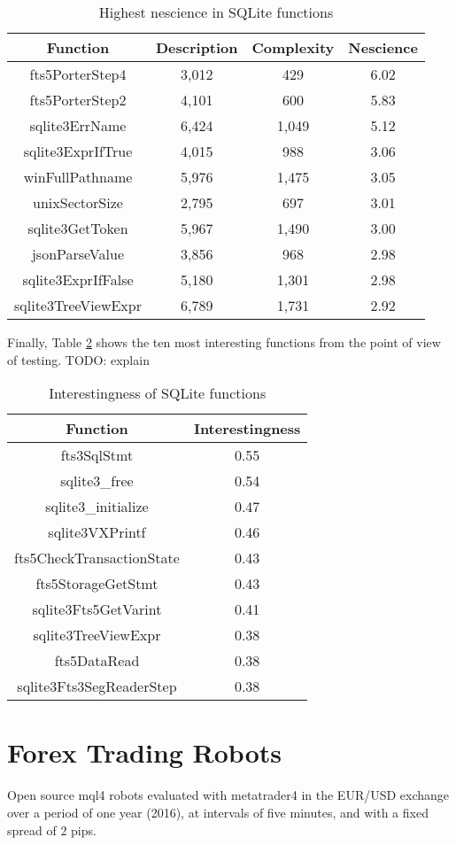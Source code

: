 \begin{table}
\begin{centering}
\begin{tabular}{|c|c|c|c|}
\hline 
Function & Description & Complexity & Nescience \tabularnewline
\hline 
\hline
fts5PorterStep4 & 3,012 & 429 & 6.02 \tabularnewline
fts5PorterStep2 & 4,101 & 600 & 5.83 \tabularnewline
sqlite3ErrName & 6,424 & 1,049 & 5.12 \tabularnewline
sqlite3ExprIfTrue & 4,015 & 988 & 3.06 \tabularnewline
winFullPathname & 5,976 & 1,475 & 3.05 \tabularnewline
unixSectorSize & 2,795 & 697 & 3.01 \tabularnewline
sqlite3GetToken & 5,967 & 1,490 & 3.00 \tabularnewline
jsonParseValue & 3,856 & 968 & 2.98 \tabularnewline
sqlite3ExprIfFalse & 5,180 & 1,301 & 2.98 \tabularnewline
sqlite3TreeViewExpr & 6,789 & 1,731 & 2.92 \tabularnewline
\hline
\end{tabular}
\par\end{centering}
\caption{\label{tab:Top-Nescience-SQLite}Highest nescience in SQLite functions}
\end{table}

Finally, Table \ref{tab:Interestingness-SQLite} shows the ten most interesting functions from the point of view of testing. {\color{red} TODO: explain}

\begin{table}
\begin{centering}
\begin{tabular}{|c|c|}
\hline 
Function & Interestingness \tabularnewline
\hline 
\hline
fts3SqlStmt & 0.55 \tabularnewline
sqlite3\_free & 0.54 \tabularnewline
sqlite3\_initialize & 0.47 \tabularnewline
sqlite3VXPrintf & 0.46 \tabularnewline
fts5CheckTransactionState & 0.43 \tabularnewline
fts5StorageGetStmt & 0.43 \tabularnewline
sqlite3Fts5GetVarint & 0.41 \tabularnewline
sqlite3TreeViewExpr & 0.38 \tabularnewline
fts5DataRead & 0.38 \tabularnewline
sqlite3Fts3SegReaderStep & 0.38 \tabularnewline
\hline
\end{tabular}
\par\end{centering}
\caption{\label{tab:Interestingness-SQLite}Interestingness of SQLite functions}
\end{table}

%
%

\section{Forex Trading Robots}
\label{sec:trading}

Open source mql4 robots evaluated with metatrader4 in the EUR/USD exchange over a period of one year (2016), at intervals of five minutes, and with a fixed spread of 2 pips.
